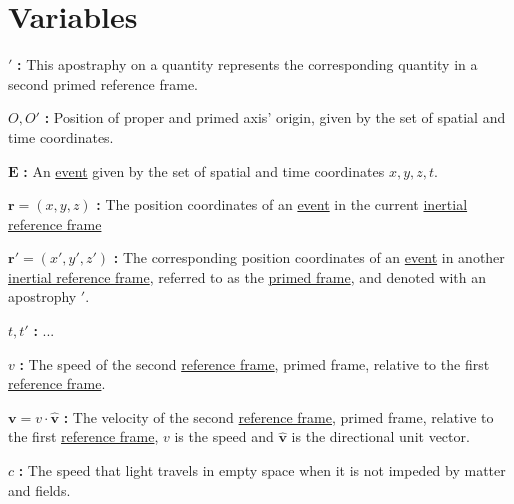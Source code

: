 \section{Variables}

\noindent ${'}$ \textbf{:}
This apostraphy on a quantity represents the corresponding quantity in a second primed reference frame.

\linesep

\noindent ${O},{O{'}}$ \textbf{:}
Position of proper and primed axis' origin, given by the set of spatial and time coordinates.

\linesep

\noindent ${\mathbf{E}}$ \textbf{:}
An \hyperlink{def-event}{event} given by the set of spatial and time coordinates $x,y,z,t$. %

\linesep

\noindent ${\mathbf{r}} = ({x},{y},{z})$ \textbf{:}
The position coordinates of an \hyperlink{def-event}{event} in the current \hyperlink{def-Inertial-reference-frame}{inertial reference frame}

\linesep

\noindent ${\mathbf{r}{'}} = ({x{'}},{y{'}},{z{'}})$ \textbf{:}
The corresponding position coordinates of an \hyperlink{def-event}{event} in another \hyperlink{def-Inertial-reference-frame}{inertial reference frame}, referred to as the \hyperlink{def-Primed-Frame}{primed frame}, and denoted with an apostrophy ${'}$.

\linesep

\noindent ${t},{t{'}}$ \textbf{:}
...

\linesep

\noindent ${v}$ \textbf{:}
The speed of the second \hyperlink{def-Reference-frame}{reference frame}, primed frame, relative to the first \hyperlink{def-Reference-frame}{reference frame}.

\linesep

\noindent ${\mathbf{v}}={v} \cdot {\mathbf{\hat{v}}}$ \textbf{:}
The velocity of the second \hyperlink{def-Reference-frame}{reference frame}, primed frame, relative to the first \hyperlink{def-Reference-frame}{reference frame}, ${v}$ is the speed and ${\mathbf{\hat{v}}}$ is the directional unit vector.

\linesep

\noindent ${c}$ \textbf{:}
The speed that light travels in empty space when it is not impeded by matter and fields.

